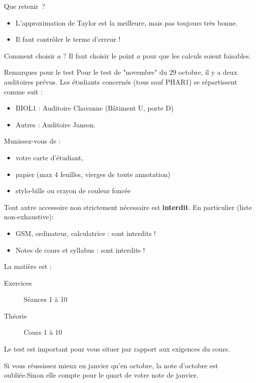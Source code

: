 \begin{frame}{Que retenir~?}
  \begin{itemize}[<+->]
  \item L'approximation de Taylor est la meilleure, mais pas toujours très bonne.
  \item Il faut contrôler le terme d'erreur !
  \end{itemize}\pause{}

  \begin{block}{Comment choisir \(a\) ?}\pause{}%
    Il faut choisir le point \(a\) pour que les calculs soient faisables.
  \end{block}
\end{frame}

\begin{frame}{Remarques pour le test}
  Pour le test de "novembre" du 29 octobre, il y a deux auditoires prévus. Les étudiants concernés (tous sauf PHAR1) se répartissent comme suit :
  \begin{itemize}
  \item BIOL1 : Auditoire Chavanne (Bâtiment U, porte D)%
  \item Autres : Auditoire Janson.
  \end{itemize}\pause

  Munissez-vous de :
  \begin{itemize}\pause
  \item votre carte d'étudiant,\pause
  \item papier (max 4 feuilles, vierges de toute annotation)\pause
  \item stylo-bille ou crayon de couleur foncée
  \end{itemize}
\end{frame}
\begin{frame}
  Tout autre accessoire non strictement nécessaire est \textbf{interdit}. En particulier (liste non-exhaustive):
  \begin{itemize}
  \item GSM, ordinateur, calculatrice : sont interdits !\pause
  \item Notes de cours et syllabus : sont interdits !
  \end{itemize}
\end{frame}
\begin{frame}
  La matière est :\pause
  \begin{description}
  \item[Exercices] Séances 1 à 10
  \item[Théorie] Cours  1 à 10 
  \end{description}\pause

  \begin{remark}
    Le test est important pour vous situer par rapport aux exigences du cours.\pause

    Si vous réussissez mieux en janvier qu'en octobre, la note d'octobre est oubliée.\pause Sinon elle compte pour le quart de votre note de janvier.
  \end{remark}
\end{frame}
\begin{frame}
\tableofcontents
\end{frame}
